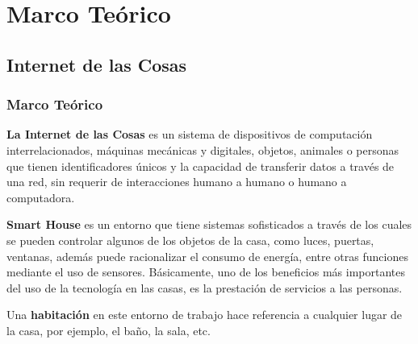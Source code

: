 \section{Marco Teórico}

\begin{frame}[t]
\subsection{Internet de las Cosas}
\frametitle{Marco Teórico}

\small
\textbf{La Internet de las Cosas} es un sistema de dispositivos de computación interrelacionados, máquinas mecánicas y digitales, objetos, animales o personas que tienen identificadores únicos y la capacidad de transferir datos a través de una red, sin requerir de interacciones humano a humano o humano a computadora. \newline

\textbf{Smart House} es un entorno que tiene sistemas sofisticados a través de los cuales se pueden controlar algunos de los objetos de la casa, como luces, puertas, ventanas, además puede racionalizar el consumo de energía, entre otras funciones mediante el uso de sensores. Básicamente, uno de los beneficios más importantes del uso de la tecnología en las casas, es la prestación de servicios a las personas.\cite{Howedi2016}\newline

Una \textbf{habitación} en este entorno de trabajo hace referencia a cualquier lugar de la casa, por ejemplo, el baño, la sala, etc.
\end{frame}